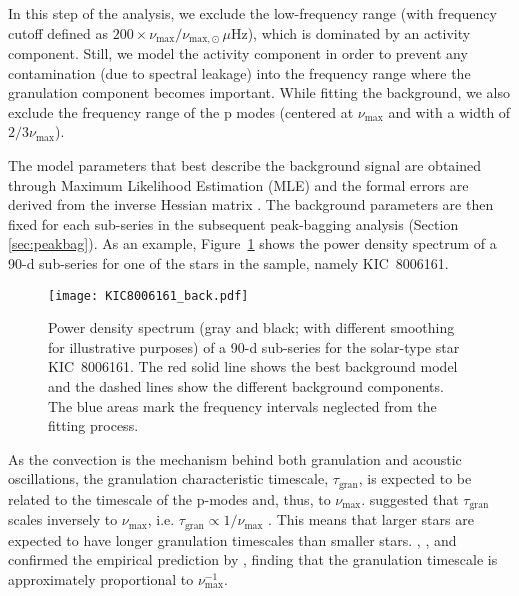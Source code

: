 \documentclass[twocolumn]{aastex61}%
\begin{document}
In this step of the analysis, we exclude the low-frequency range (with frequency cutoff defined as $200\times\nu_\text{max}/\nu_{\text{max},\odot}\,\mu\text{Hz}$), which is dominated by an activity component. Still, we model the activity component in order to prevent any contamination (due to spectral leakage) into the frequency range where the granulation component becomes important. While fitting the background, we also exclude the frequency range  of the p modes (centered at $\nu_\text{max}$ and with a width of $2/3\nu_\text{max}$).

The model parameters that best describe the background signal are obtained through Maximum Likelihood Estimation (MLE) and the formal errors are derived from the inverse Hessian matrix \citep[e.g.][]{Toutain1994,Campante2011}. 
The background parameters are then fixed for each sub-series in the subsequent peak-bagging analysis (Section \ref{sec:peakbag}).
As an example, Figure~\ref{fig:back} shows the power density spectrum of a 90-d sub-series for one of the stars in the sample, namely KIC~8006161. 

\begin{figure}[h]
\texttt{[image: KIC8006161\_back.pdf]}\vspace{-0.1cm}
\caption{Power density spectrum (gray and black; with different smoothing for illustrative purposes) of a 90-d sub-series for the solar-type star KIC~8006161. The red solid line shows the best background model and the dashed lines show the different background components. The blue areas mark the frequency intervals neglected from the fitting process.}\label{fig:back}
\end{figure}

As the convection is the mechanism behind both granulation and acoustic oscillations, the granulation characteristic timescale, $\tau_\text{gran}$, is expected to be related to the timescale of the p-modes and, thus, to $\nu_\text{max}$. \citet{Huber2009} suggested that $\tau_\text{gran}$ scales inversely to $\nu_\text{max}$, i.e.  $\tau_\text{gran}\propto1/\nu_\text{max}$ \citep[see also][]{Kjeldsen2011}. This means that larger stars are expected to have longer granulation timescales than smaller stars. \citet[based on CoRoT red giant and main-sequence solar-type pulsators]{Kallinger2010}, \citet[based on {\it Kepler} red giants]{Mathur2011}, and \citet[based on {\it Kepler} main-sequence stars, sub-giants, and red giants]{Kallinger2014} confirmed the empirical prediction by \citet{Huber2009}, finding that the granulation timescale is approximately proportional to $\nu_\text{max}^{-1}$.
\end{document}
